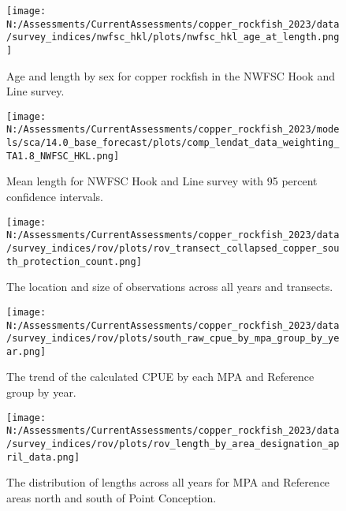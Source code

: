 \documentclass[11pt,
  english,
  letterpaper,
]{article}
\begin{document}
\pagebreak

\begin{figure}
\centering
\texttt{[image: N:/Assessments/CurrentAssessments/copper\_rockfish\_2023/data/survey\_indices/nwfsc\_hkl/plots/nwfsc\_hkl\_age\_at\_length.png]}
\caption{Age and length by sex for copper rockfish in the NWFSC Hook and Line survey.\label{fig:nwfsc-hkl-len-age}}
\end{figure}

\pagebreak

\begin{figure}
\centering
\texttt{[image: N:/Assessments/CurrentAssessments/copper\_rockfish\_2023/models/sca/14.0\_base\_forecast/plots/comp\_lendat\_data\_weighting\_TA1.8\_NWFSC\_HKL.png]}
\caption{Mean length for NWFSC Hook and Line survey with 95 percent confidence intervals.\label{fig:mean-hkl-len-data}}
\end{figure}

\pagebreak

\begin{figure}
\centering
\texttt{[image: N:/Assessments/CurrentAssessments/copper\_rockfish\_2023/data/survey\_indices/rov/plots/rov\_transect\_collapsed\_copper\_south\_protection\_count.png]}
\caption{The location and size of observations across all years and transects.\label{fig:rov-obs-loc}}
\end{figure}

\pagebreak

\begin{figure}
\centering
\texttt{[image: N:/Assessments/CurrentAssessments/copper\_rockfish\_2023/data/survey\_indices/rov/plots/south\_raw\_cpue\_by\_mpa\_group\_by\_year.png]}
\caption{The trend of the calculated CPUE by each MPA and Reference group by year.\label{fig:rov-raw-cpue}}
\end{figure}

\pagebreak

\begin{figure}
\centering
\texttt{[image: N:/Assessments/CurrentAssessments/copper\_rockfish\_2023/data/survey\_indices/rov/plots/rov\_length\_by\_area\_designation\_april\_data.png]}
\caption{The distribution of lengths across all years for MPA and Reference areas north and south of Point Conception.\label{fig:rov-len}}
\end{figure}

\pagebreak
\end{document}
